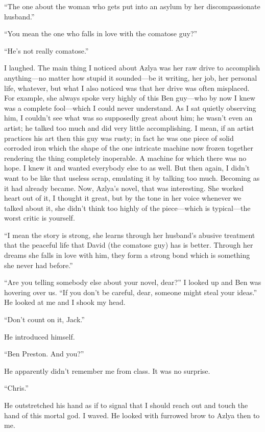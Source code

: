 ``The one about the woman who gets put into an asylum by her
discompassionate husband.''

``You mean the one who falls in love with the comatose guy?''

``He's not really comatose.''

I laughed. The main thing I noticed about Azlya was her raw drive to
accomplish anything---no matter how stupid it sounded---be it writing,
her job, her personal life, whatever, but what I also noticed was that
her drive was often misplaced. For example, she always spoke very highly
of this Ben guy---who by now I knew was a complete fool---which I could
never understand. As I sat quietly observing him, I couldn't see what
was so supposedly great about him; he wasn't even an artist; he talked
too much and did very little accomplishing. I mean, if an artist
practices his art then this guy was rusty; in fact he was one piece of
solid corroded iron which the shape of the one intricate machine now
frozen together rendering the thing completely inoperable. A machine for
which there was no hope. I knew it and wanted everybody else to as well.
But then again, I didn't want to be like that useless scrap, emulating
it by talking too much. Becoming as it had already became. Now, Azlya's
novel, that was interesting. She worked heart out of it, I thought it
great, but by the tone in her voice whenever we talked about it, she
didn't think too highly of the piece---which is typical---the worst
critic is yourself.

``I mean the story is strong, she learns through her husband's abusive
treatment that the peaceful life that David (the comatose guy) has is
better. Through her dreams she falls in love with him, they form a
strong bond which is something she never had before.''

``Are you telling somebody else about your novel, dear?'' I looked up
and Ben was hovering over us. ``If you don't be careful, dear, someone
might steal your ideas.'' He looked at me and I shook my head.

``Don't count on it, Jack.''

He introduced himself.

``Ben Preston. And you?''

He apparently didn't remember me from class. It was no surprise.

``Chris.''

He outstretched his hand as if to signal that I should reach out and
touch the hand of this mortal god. I waved. He looked with furrowed brow
to Azlya then to me.

